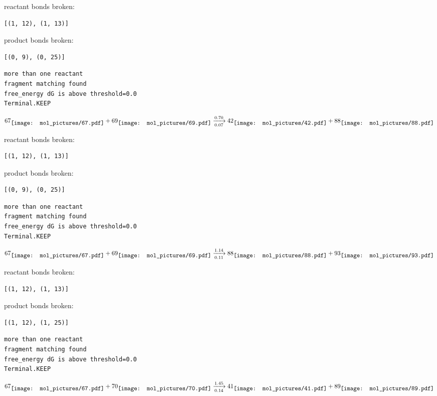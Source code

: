\documentclass{article}
\begin{document}
reactant bonds broken:\begin{verbatim}
[(1, 12), (1, 13)]
\end{verbatim}
product bonds broken:\begin{verbatim}
[(0, 9), (0, 25)]
\end{verbatim}




\vspace{1cm}
\begin{verbatim}
more than one reactant
fragment matching found
free_energy dG is above threshold=0.0
Terminal.KEEP
\end{verbatim}
$$
67
\raisebox{-.5\height}{\texttt{[image: mol\_pictures/67.pdf]}}
+
69
\raisebox{-.5\height}{\texttt{[image: mol\_pictures/69.pdf]}}
\xrightarrow[0.07]{0.70}
42
\raisebox{-.5\height}{\texttt{[image: mol\_pictures/42.pdf]}}
+
88
\raisebox{-.5\height}{\texttt{[image: mol\_pictures/88.pdf]}}
$$


reactant bonds broken:\begin{verbatim}
[(1, 12), (1, 13)]
\end{verbatim}
product bonds broken:\begin{verbatim}
[(0, 9), (0, 25)]
\end{verbatim}




\vspace{1cm}
\begin{verbatim}
more than one reactant
fragment matching found
free_energy dG is above threshold=0.0
Terminal.KEEP
\end{verbatim}
$$
67
\raisebox{-.5\height}{\texttt{[image: mol\_pictures/67.pdf]}}
+
69
\raisebox{-.5\height}{\texttt{[image: mol\_pictures/69.pdf]}}
\xrightarrow[0.11]{1.14}
88
\raisebox{-.5\height}{\texttt{[image: mol\_pictures/88.pdf]}}
+
93
\raisebox{-.5\height}{\texttt{[image: mol\_pictures/93.pdf]}}
$$


reactant bonds broken:\begin{verbatim}
[(1, 12), (1, 13)]
\end{verbatim}
product bonds broken:\begin{verbatim}
[(1, 12), (1, 25)]
\end{verbatim}




\vspace{1cm}
\begin{verbatim}
more than one reactant
fragment matching found
free_energy dG is above threshold=0.0
Terminal.KEEP
\end{verbatim}
$$
67
\raisebox{-.5\height}{\texttt{[image: mol\_pictures/67.pdf]}}
+
70
\raisebox{-.5\height}{\texttt{[image: mol\_pictures/70.pdf]}}
\xrightarrow[0.14]{1.45}
41
\raisebox{-.5\height}{\texttt{[image: mol\_pictures/41.pdf]}}
+
89
\raisebox{-.5\height}{\texttt{[image: mol\_pictures/89.pdf]}}
$$
\end{document}
